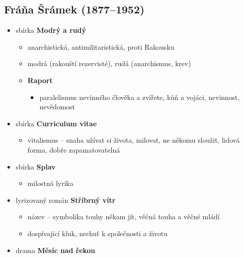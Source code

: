 \subsection{Fráňa Šrámek (1877--1952)}
\begin{itemize}
\item sbírka \textbf{Modrý a rudý}
	\begin{itemize}
	\item anarchistická, antimilitaristická, proti Rakousku
	\item modrá (rakouští rezervisté), rudá (anarchismus, krev)
	\item \textbf{Raport}
		\begin{itemize}
		\item paralelismus nevinného člověka a zvířete, kůň a vojáci, nevinnost, nevědomost
		\end{itemize}
	\end{itemize}
\item sbírka \textbf{Curriculum vitae}
	\begin{itemize}
	\item vitalismus -- snaha užívat si života, milovat, ne někomu sloužit, lidová forma, dobře zapamatovatelná
	\end{itemize}
\item sbírka \textbf{Splav}
	\begin{itemize}
	\item milostná lyrika
	\end{itemize}
\item lyrizovaný román \textbf{Stříbrný vítr}
	\begin{itemize}
	\item název -- symbolika touhy někam jít, věčná touha a věčné mládí
	\item dospívající kluk, nechuť k společnosti a životu
	\end{itemize}
\item drama \textbf{Měsíc nad řekou}
\end{itemize}

